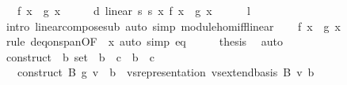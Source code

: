 \begin{isabellebody}
\ \ \ {\isachardoublequoteopen}f\ x\ {\isacharequal}{\kern0pt}\ g\ x{\isachardoublequoteclose}\isanewline
%
\isadelimproof
%
\endisadelimproof
%
\isatagproof
{}\isamarkupfalse%
\ {\isacharminus}{\kern0pt}\isanewline
\ \ \isamarkupfalse%
\ d{\isacharcolon}{\kern0pt}\ linear\ s{}\ s{}\ {\isachardoublequoteopen}{\isasymlambda}x{\isachardot}{\kern0pt}\ f\ x\ {\isacharminus}{\kern0pt}\ g\ x{\isachardoublequoteclose}\isanewline
\ \ \ \ \isamarkupfalse%
\ l\ \isamarkupfalse%
\ {\isacharparenleft}{\kern0pt}intro\ linear{\isacharunderscore}{\kern0pt}compose{\isacharunderscore}{\kern0pt}sub{\isacharparenright}{\kern0pt}\ {\isacharparenleft}{\kern0pt}auto\ simp{\isacharcolon}{\kern0pt}\ module{\isacharunderscore}{\kern0pt}hom{\isacharunderscore}{\kern0pt}iff{\isacharunderscore}{\kern0pt}linear{\isacharparenright}{\kern0pt}\isanewline
\ \ \isamarkupfalse%
\ {\isachardoublequoteopen}f\ x\ {\isacharminus}{\kern0pt}\ g\ x\ {\isacharequal}{\kern0pt}\ {}{\isachardoublequoteclose}\isanewline
\ \ \ \ \isamarkupfalse%
\ {\isacharparenleft}{\kern0pt}rule\ d{\isachardot}{\kern0pt}eq{\isacharunderscore}{\kern0pt}{}{\isacharunderscore}{\kern0pt}on{\isacharunderscore}{\kern0pt}span{\isacharbrackleft}{\kern0pt}OF\ {\isacharunderscore}{\kern0pt}\ x{\isacharbrackright}{\kern0pt}{\isacharparenright}{\kern0pt}\ {\isacharparenleft}{\kern0pt}auto\ simp{\isacharcolon}{\kern0pt}\ eq{\isacharparenright}{\kern0pt}\isanewline
\ \ \isamarkupfalse%
\ \isamarkupfalse%
\ {\isacharquery}{\kern0pt}thesis\ \isamarkupfalse%
\ auto\isanewline
{}\isamarkupfalse%
%
\endisatagproof
{\isafoldproof}%
%
\isadelimproof
\isanewline
%
\endisadelimproof
\isanewline
{}\isamarkupfalse%
\ construct\ {\isacharcolon}{\kern0pt}{\isacharcolon}{\kern0pt}\ {\isachardoublequoteopen}{\isacharprime}{\kern0pt}b\ set\ {\isasymRightarrow}\ {\isacharparenleft}{\kern0pt}{\isacharprime}{\kern0pt}b\ {\isasymRightarrow}\ {\isacharprime}{\kern0pt}c{\isacharparenright}{\kern0pt}\ {\isasymRightarrow}\ {\isacharparenleft}{\kern0pt}{\isacharprime}{\kern0pt}b\ {\isasymRightarrow}\ {\isacharprime}{\kern0pt}c{\isacharparenright}{\kern0pt}{\isachardoublequoteclose}\isanewline
\ \ \ {\isachardoublequoteopen}construct\ B\ g\ v\ {\isacharequal}{\kern0pt}\ {\isacharparenleft}{\kern0pt}{\isasymSum}b\ {\isacharbar}{\kern0pt}\ vs{}{\isachardot}{\kern0pt}representation\ {\isacharparenleft}{\kern0pt}vs{}{\isachardot}{\kern0pt}extend{\isacharunderscore}{\kern0pt}basis\ B{\isacharparenright}{\kern0pt}\ v\ b\ {\isasymnoteq}\ {}{\isachardot}{\kern0pt}\isanewline

\end{isabellebody}
